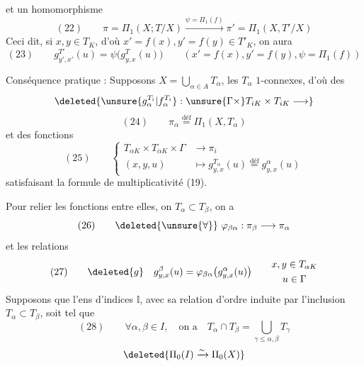 et un homomorphisme
\[
(22)\qquad\pi=\Pi_1(X;T/X)\overset{\psi=\Pi_1(f)}{\longrightarrow}\pi'=\Pi_1(X,T'/X)
\]
Ceci dit, si $x,y\in T_K$, d'où $x'=f(x),y'=f(y)\in T'_K$, on aura
\[
(23)\qquad g_{y',x'}^{T'}(u)=\psi\bigl(g_{y,x}^T(u)\bigr)
\qquad(x'=f(x),y'=f(y),\psi=\Pi_1(f))
\]

Conséquence pratique : Supposons $X=\bigcup_{\alpha\in A}T_\alpha$, les $T_\alpha$ $1$-connexes, d'où des  
\[
\deleted{\unsure{g_\alpha^{T_i}|f_\alpha^{T_i}}:\unsure{\Gamma\times}T_{iK}\times T_{iK}\longrightarrow}
\]
\[
(24)\qquad \pi_\alpha\overset{\text{déf}}{=}\Pi_1(X,T_\alpha)
\]
et des fonctions
\[
(25)\qquad\left\{\begin{aligned}
T_{\alpha K}\times T_{\alpha K}\times\Gamma&\longrightarrow\pi_i\\
(x,y,u)&\longmapsto g_{y,x}^{T_\alpha}(u)\overset{\text{déf}}{=}g_{y,x}^{\alpha}(u)
\end{aligned}\right.
\]
satisfaisant la formule de multiplicativité (19).

Pour relier les fonctions entre elles,  on   $T_\alpha\subset T_\beta$, on a
\[
(26)\qquad\deleted{\unsure{\forall}}\ \varphi_{\beta\alpha}:\pi_\beta\longrightarrow\pi_\alpha
\]
et les relations
\[
(27)\qquad\deleted{g}\quad g_{y,x}^{\beta}(u)=\varphi_{\beta\alpha}\bigl(g_{y,x}^{\alpha}(u)\bigr)\qquad\begin{gathered}x,y\in T_{\alpha K}\\u\in\Gamma\end{gathered}
\]
Supposons que l'ens d'indices $\mathbb{I}$, avec sa relation d'ordre induite par l'inclusion $T_\alpha\subset T_\beta$, soit tel que 
\[
(28)\qquad\forall\alpha,\beta\in I,\quad\text{on a}\quad T_\alpha\cap T_\beta=\bigcup_{\gamma\le\alpha,\beta}T_\gamma
\]
\[
\deleted{\Pi_0(I)\xrightarrow{\sim}\Pi_0(X)}
\]

